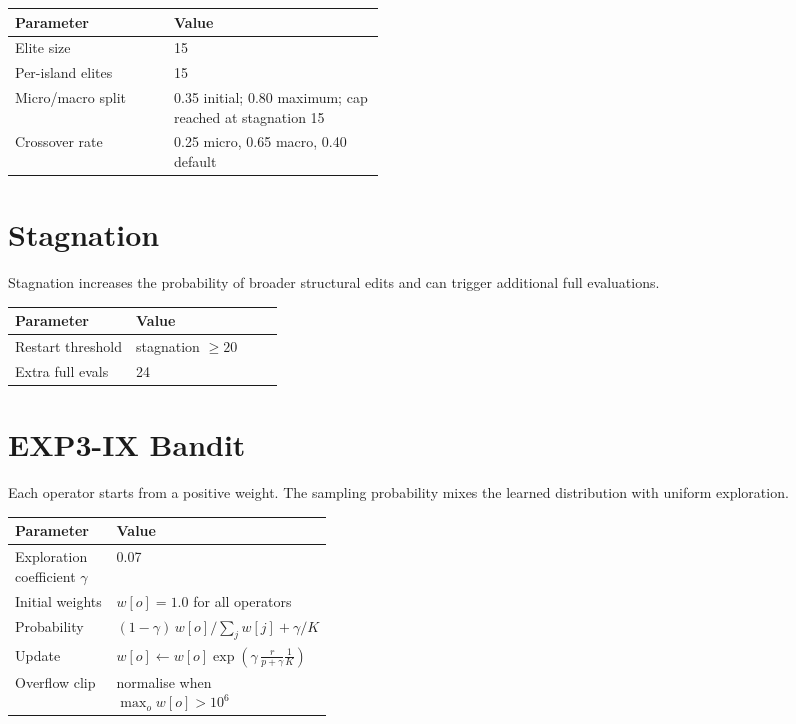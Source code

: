 \documentclass[10pt,twocolumn]{article}
\newenvironment{hptable}{%
  \begin{tcolorbox}[tablebox]
  \footnotesize
  \renewcommand{\arraystretch}{1.12}
  \setlength{\tabcolsep}{3.0pt}
}{%
  \end{tcolorbox}
}
\begin{document}
\begin{hptable}
\begin{tabularx}{\linewidth}{@{}W{0.43\linewidth}Y@{}}
\toprule
\textbf{Parameter} & \textbf{Value} \\
\midrule
Elite size & 15 \\
Per-island elites & 15 \\
Micro/macro split & 0.35 initial; 0.80 maximum; cap reached at stagnation 15 \\
Crossover rate & 0.25 micro, 0.65 macro, 0.40 default \\
\bottomrule
\end{tabularx}
\end{hptable}

\section{Stagnation}
Stagnation increases the probability of broader structural edits and can trigger additional full evaluations.

\begin{hptable}
\begin{tabularx}{\linewidth}{@{}W{0.45\linewidth}Y@{}}
\toprule
\textbf{Parameter} & \textbf{Value} \\
\midrule
Restart threshold & stagnation $\geq 20$ \\
Extra full evals & 24 \\
\bottomrule
\end{tabularx}
\end{hptable}

\section{EXP3-IX Bandit}
Each operator starts from a positive weight. The sampling probability mixes the learned distribution with uniform exploration.

\begin{hptable}
\begin{tabularx}{\linewidth}{@{}W{0.37\linewidth}Y@{}}
\toprule
\textbf{Parameter} & \textbf{Value} \\
\midrule
Exploration coefficient $\gamma$ & 0.07 \\
Initial weights & $w[o]=1.0$ for all operators \\
Probability & $(1-\gamma)\,w[o]/\sum_j w[j]+\gamma/K$ \\
Update & $w[o]\leftarrow w[o]\exp\!\left(\gamma\,\frac{r}{p+\gamma}\frac{1}{K}\right)$ \\
Overflow clip & normalise when $\max_o w[o] > 10^6$ \\
\bottomrule
\end{tabularx}
\end{hptable}
\end{document}
